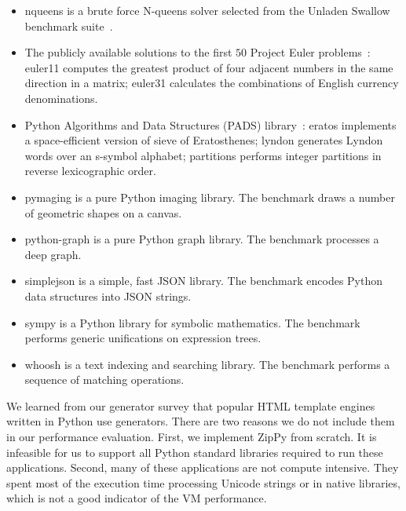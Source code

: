 \begin{itemize}

\item \textsf{nqueens} is a brute force N-queens solver selected from the Unladen Swallow benchmark suite~\cite{unladen.swallow}.

\item The publicly available solutions to the first $50$ Project Euler problems~\cite{projecteuler}:
\textsf{euler11} computes the greatest product of four adjacent numbers in the same direction in a matrix;
\textsf{euler31} calculates the combinations of English currency denominations.

\item Python Algorithms and Data Structures (PADS) library~\cite{pads}:
\textsf{eratos} implements a space-efficient version of sieve of Eratosthenes;
\textsf{lyndon} generates Lyndon words over an s-symbol alphabet;
\textsf{partitions} performs integer partitions in reverse lexicographic order.

\item \textsf{pymaging} is a pure Python imaging library.
The benchmark draws a number of geometric shapes on a canvas.

\item \textsf{python-graph} is a pure Python graph library.
The benchmark processes a deep graph.

\item \textsf{simplejson} is a simple, fast JSON library.
The benchmark encodes Python data structures into JSON strings.

\item \textsf{sympy} is a Python library for symbolic mathematics.
The benchmark performs generic unifications on expression trees.

\item \textsf{whoosh} is a text indexing and searching library.
The benchmark performs a sequence of matching operations.

\end{itemize}

We learned from our generator survey that popular HTML template engines written in Python use generators.
There are two reasons we do not include them in our performance evaluation.
First, we implement ZipPy from scratch.
It is infeasible for us to support all Python standard libraries required to run these applications.
Second, many of these applications are not compute intensive.
They spent most of the execution time processing Unicode strings or in native libraries, which is not a good indicator of the VM performance.

